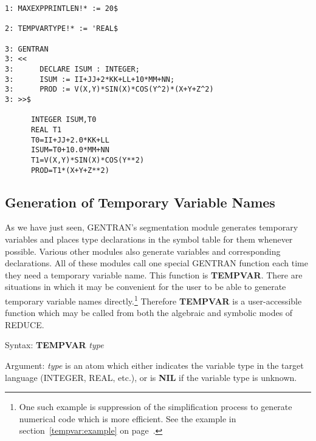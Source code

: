 \newpage
\begin{describe}{\example} 

\begin{verbatim}
1: MAXEXPPRINTLEN!* := 20$

2: TEMPVARTYPE!* := 'REAL$ 

3: GENTRAN 
3: << 
3:      DECLARE ISUM : INTEGER; 
3:      ISUM := II+JJ+2*KK+LL+10*MM+NN; 
3:      PROD := V(X,Y)*SIN(X)*COS(Y^2)*(X+Y+Z^2) 
3: >>$ 

      INTEGER ISUM,T0
      REAL T1
      T0=II+JJ+2.0*KK+LL
      ISUM=T0+10.0*MM+NN
      T1=V(X,Y)*SIN(X)*COS(Y**2)
      PROD=T1*(X+Y+Z**2)
\end{verbatim}
\end{describe}
\subsection{Generation of Temporary Variable Names}
\label{tempvars} 
As we have just seen, GENTRAN's segmentation module generates
temporary variables and places type declarations in the symbol table
for them whenever possible.  Various other modules also generate
variables and corresponding declarations.  All of these modules call
one special GENTRAN function each time they need a temporary
variable name.  This function is {\bf TEMPVAR}.  There are situations
in which it may be convenient for the user to be able to generate
temporary variable names directly.\footnote{One such example is suppression
of the simplification process to generate numerical code which is more
efficient.  See the example in section~\ref{tempvar:example} on
page~\pageref{tempvar:example}.}
Therefore {\bf TEMPVAR} 
is a user-accessible function which may be called from both
the algebraic and symbolic modes of REDUCE.
\begin{describe}{Syntax:}
{\bf TEMPVAR} {\it type}
\end{describe}
\begin{describe}{Argument:}
{\it type} is an atom which either indicates the variable type in the
target language (INTEGER, REAL, etc.), or is {\bf NIL} if the variable
type is unknown.
\end{describe}
